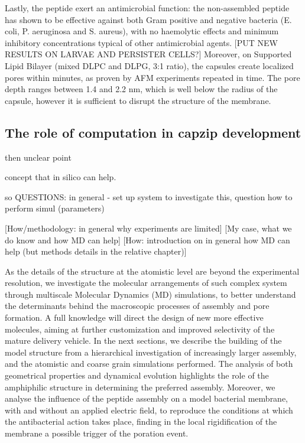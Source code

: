 Lastly, the peptide exert an antimicrobial function: the non-assembled peptide has shown to be effective against both Gram positive and negative bacteria (E. coli, P. aeruginosa and S. aureus), with no haemolytic effects and minimum inhibitory concentrations typical of other antimicrobial agents. [PUT NEW RESULTS ON LARVAE AND PERSISTER CELLS?]
%
Moreover, on Supported Lipid Bilayer (mixed DLPC and DLPG, 3:1 ratio), the capsules create localized pores within minutes, as proven by AFM experiments repeated in time. The pore depth ranges between 1.4 and 2.2 nm, which is well below the radius of the capsule, however it is sufficient to disrupt the structure of the membrane.



\subsection{The role of computation in capzip development}

then unclear point

concept that in silico can help.

so QUESTIONS:
in general - set up system to investigate this, question how to perform simul (parameters)


[How/methodology: in general why experiments are limited]
[My case, what we do know and how MD can help]
[How: introduction on in general how MD can help (but methods details in the relative chapter)]


As the details of the structure at the atomistic level are beyond the experimental resolution, we investigate the molecular arrangements of such complex system through multiscale Molecular Dynamics (MD) simulations, to better understand the determinants behind the macroscopic processes of assembly and pore formation.
A full knowledge will direct the design of new more effective molecules, aiming at further customization and improved selectivity of the mature delivery vehicle.
In the next sections, we describe the building of the model structure from a hierarchical investigation of increasingly larger assembly, and the atomistic and coarse grain simulations performed. The analysis of both geometrical properties and dynamical evolution highlights the role of the amphiphilic structure in determining the preferred assembly.
Moreover, we analyse the influence of the peptide assembly on a model bacterial membrane, with and without an applied electric field, to reproduce the conditions at which the antibacterial action takes place, finding in the local rigidification of the membrane a possible trigger of the poration event.


